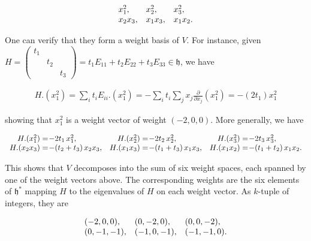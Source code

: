 \documentclass[10pt,a4paper]{article}
\begin{document}
\[\begin{aligned}
\begin{array}[]{lll}x_{1}^{2},&x_{2}^{2},&x_{3}^{2},\\ x_{2}x_{3},&x_{1}x_{3},&x_{1}x_{2}.\end{array}
\end{aligned}\]


One can verify that they form a weight basis of $V$. For instance, given $H=\left(\begin{smallmatrix}t_{1}&&\\ &t_{2}&\\ &&t_{3}\end{smallmatrix}\right)=t_{1}E_{11}+t_{2}E_{22}+t_{3}E_{33}\in\mathfrak{h}$, we have



\[\begin{aligned}
H.(x_{1}^{2})=\textstyle\sum_{i}t_{i}E_{ii}.(x_{1}^{2})=-\sum_{i}t_{i}\sum_{j}x_{j}\displaystyle\frac{\partial}{\partial x_{j}}(x_{1}^{2})=-(2t_{1})x_{1}^{2}
\end{aligned}\]


showing that $x_{1}^{2}$ is a weight vector of weight $(-2,0,0)$. More generally, we have



\[\begin{aligned}
\begin{array}[]{rlrlrl}H.(x_{1}^{2})=\hskip-4.62497pt&\hskip-4.62497pt-2t_{1}\,x_{1}^{2},&H.(x_{2}^{2})=\hskip-4.62497pt&\hskip-4.62497pt-2t_{2}\,x_{2}^{2},&H.(x_{3}^{2})=\hskip-4.62497pt&\hskip-4.62497pt-2t_{3}\,x_{3}^{2},\\ H.(x_{2}x_{3})=\hskip-4.62497pt&\hskip-4.62497pt-(t_{2}+t_{3})\,x_{2}x_{3},&H.(x_{1}x_{3})=\hskip-4.62497pt&\hskip-4.62497pt-(t_{1}+t_{3})\,x_{1}x_{3},&H.(x_{1}x_{2})=\hskip-4.62497pt&\hskip-4.62497pt-(t_{1}+t_{2})\,x_{1}x_{2}.\end{array}
\end{aligned}\]


This shows that $V$ decomposes into the sum of six weight spaces, each spanned by one of the weight vectors above. The corresponding weights are the six elements of $\mathfrak{h}^{*}$ mapping $H$ to the eigenvalues of $H$ on each weight vector. As $k$-tuple of integers, they are



\[\begin{aligned}
\begin{array}[]{lll}(-2,0,0),&(0,-2,0),&(0,0,-2),\\ (0,-1,-1),&(-1,0,-1),&(-1,-1,0).\end{array}
\end{aligned}\]
\end{document}
